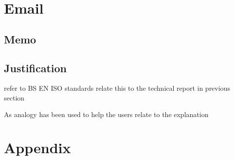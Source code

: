\documentclass{article}
\begin{document}

\section{Email}
\subsection{Memo}%




\subsection{Justification}%


refer to BS EN ISO standards
relate this to the technical report in previous section

As analogy has been used to help the users relate to the explanation

\newpage
\raggedright
{}

\newpage
\section{Appendix}
\end{document}
